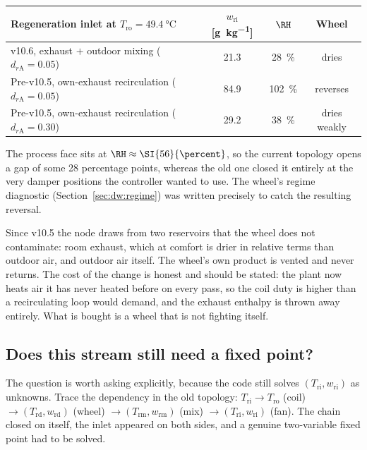 \begin{center}
\begin{tabular}{@{}lccc@{}}
\toprule
Regeneration inlet at $T_{\mathrm{ro}}=\SI{49.4}{\celsius}$
 & $w_{\mathrm{ri}}$ [\si{\gram\per\kilogram}] & $\RH$ & Wheel \\
\midrule
v10.6, exhaust $+$ outdoor mixing ($d_{r\mathrm{A}}=0.05$) & 21.3 & \SI{28}{\percent} & dries \\
Pre-v10.5, own-exhaust recirculation ($d_{r\mathrm{A}}=0.05$) & 84.9 & \SI{102}{\percent} & reverses \\
Pre-v10.5, own-exhaust recirculation ($d_{r\mathrm{A}}=0.30$) & 29.2 & \SI{38}{\percent} & dries weakly \\
\bottomrule
\end{tabular}
\end{center}

\noindent
The process face sits at $\RH\approx\SI{56}{\percent}$, so the current
topology opens a gap of some \num{28} percentage points, whereas the old one
closed it entirely at the very damper positions the controller wanted to use.
The wheel's regime diagnostic (Section~\ref{sec:dw:regime}) was written
precisely to catch the resulting reversal.

Since v10.5 the node draws from two reservoirs that the wheel does not
contaminate: room exhaust, which at comfort is drier in relative terms than
outdoor air, and outdoor air itself. The wheel's own product is vented and
never returns. The cost of the change is honest and should be stated: the plant
now heats air it has never heated before on every pass, so the coil duty is
higher than a recirculating loop would demand, and the exhaust enthalpy is
thrown away entirely. What is bought is a wheel that is not fighting itself.

\subsection{Does this stream still need a fixed point?}
\label{sec:air:fixedpoint}

The question is worth asking explicitly, because the code still solves
$(T_{\mathrm{ri}},w_{\mathrm{ri}})$ as unknowns. Trace the dependency in the
old topology:
$T_{\mathrm{ri}}\to T_{\mathrm{ro}}$ (coil)
$\to (T_{\mathrm{rd}},w_{\mathrm{rd}})$ (wheel)
$\to (T_{\mathrm{rm}},w_{\mathrm{rm}})$ (mix)
$\to (T_{\mathrm{ri}},w_{\mathrm{ri}})$ (fan). The chain closed on itself, the
inlet appeared on both sides, and a genuine two-variable fixed point had to be
solved.


